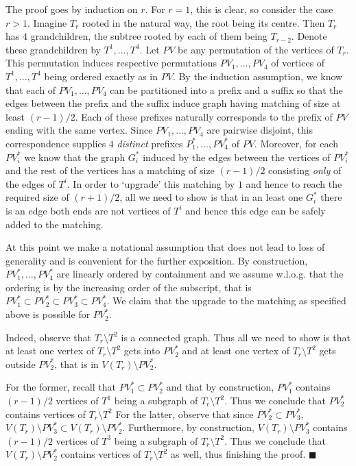 \documentclass{article}
\begin{document}
The proof goes by induction on $r$. For $r=1$, this is clear,
so consider the case $r>1$. Imagine $T_r$ rooted in the natural way, the root being its centre.
Then $T_r$ has $4$ grandchildren, the subtree rooted by each of them being
$T_{r-2}$. Denote these grandchildren by $T^1, \dots, T^4$.
Let $PV$ be any permutation of the vertices of $T_r$. This permutation induces
respective permutations $PV_1, \dots, PV_4$ of vertices of $T^1, \dots, T^4$
being ordered exactly as in $PV$. By the induction assumption, we know that
each of $PV_1, \dots, PV_4$ can be partitioned into a prefix and a suffix
so that the edges between the prefix and the suffix induce graph having
matching of size at least $(r-1)/2$. Each of these prefixes naturally corresponds
to the prefix of $PV$ ending with the same vertex. Since $PV_1, \dots, PV_4$ are 
pairwise disjoint, this correspondence supplies $4$ \emph{distinct} prefixes 
$P^*_1, \dots, PV^*_4$ of $PV$.
Moreover, for each $PV^*_i$ we know that the graph $G^*_i$ induced by the edges between the
vertices of $PV^*_i$ and the rest of the vertices has a matching of size $(r-1)/2$ consisting 
\emph{only} of the edges of $T^i$. In order to `upgrade' this
matching by $1$ and hence to reach the required size of $(r+1)/2$, all we need to show is that
in an least one $G^*_i$ there is an edge both ends are not vertices of $T^i$ and hence this
edge can be safely added to the matching. 

At this point we make a notational assumption that does not lead to loss of generality 
and is convenient for the further exposition. By construction, $PV^*_1, \dots, PV^*_4$
are linearly ordered by containment and we assume w.l.o.g. that the ordering is by the increasing 
order of the subscript, that is $PV^*_1 \subset PV^*_2 \subset PV^*_3 \subset PV^*_4$. 
We claim that the upgrade to the matching as specified above is possible for $PV^*_2$.

Indeed, observe that $T_r \setminus T^2$ is a connected graph. Thus all we need to show
is that at least one vertex of $T_r \setminus T^2$ gets into $PV^*_2$ and at least one
vertex of $T_r \setminus T^2$ gets outside $PV^*_2$, that is in $V(T_r) \setminus PV^*_2$.

For the former, recall that $PV^*_1 \subset PV^*_2$ and that by construction, $PV^*_1$
contains $(r-1)/2$ vertices of $T^1$ being a subgraph of $T_r \setminus T^2$.
Thus we conclude that $PV^*_2$ contains vertices of $T_r \setminus T^2$
For the latter, observe that since $PV^*_2 \subset PV^*_3$, $V(T_r) \setminus PV^*_3 \subset 
V(T_r) \setminus PV^*_2$. Furthermore, by construction, $V(T_r) \setminus PV^*_3$ contains
$(r-1)/2$ vertices of $T^3$ being a subgraph of $T_r \setminus T^2$. 
Thus we conclude that $V(T_r) \setminus PV^*_2$ contains vertices of $T_r \setminus T^2$ as well,
thus finishing the proof. $\blacksquare$
\end{document}
